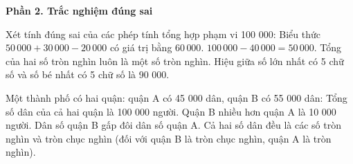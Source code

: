 \textbf{Phần 2. Trắc nghiệm đúng sai}

\begin{ex} %
Xét tính đúng sai của các phép tính tổng hợp phạm vi 100 000:
\choiceTF
{\True Biểu thức $50\,000 + 30\,000 - 20\,000$ có giá trị bằng $60\,000$.}
{$100\,000 - 40\,000 = 50\,000$.}
{\True Tổng của hai số tròn nghìn luôn là một số tròn nghìn.}
{Hiệu giữa số lớn nhất có 5 chữ số và số bé nhất có 5 chữ số là 90 000.}
\end{ex}

\begin{ex} %
Một thành phố có hai quận: quận A có 45 000 dân, quận B có 55 000 dân:
\choiceTF
{\True Tổng số dân của cả hai quận là 100 000 người.}
{\True Quận B nhiều hơn quận A là 10 000 người.}
{Dân số quận B gấp đôi dân số quận A.}
{\True Cả hai số dân đều là các số tròn nghìn và tròn chục nghìn (đối với quận B là tròn chục nghìn, quận A là tròn nghìn).}
\end{ex}

